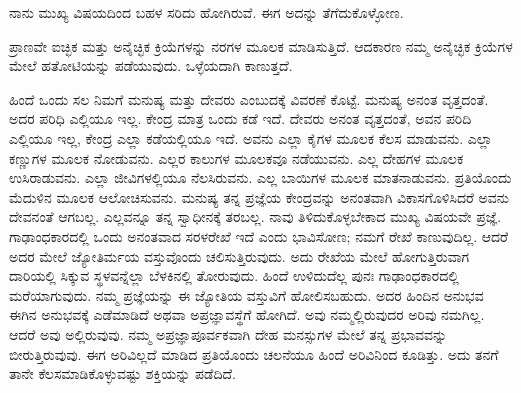 ನಾನು ಮುಖ್ಯ ವಿಷಯದಿಂದ ಬಹಳ ಸರಿದು ಹೋಗಿರುವೆ. ಈಗ ಅದನ್ನು ತೆಗೆದುಕೊಳ್ಳೋಣ.

ಪ್ರಾಣವೇ ಐಚ್ಛಿಕ ಮತ್ತು ಅನೈಚ್ಛಿಕ ಕ್ರಿಯೆಗಳನ್ನು ನರಗಳ ಮೂಲಕ ಮಾಡಿಸುತ್ತಿದೆ. ಆದಕಾರಣ ನಮ್ಮ ಅನೈಚ್ಛಿಕ ಕ್ರಿಯೆಗಳ ಮೇಲೆ ಹತೋಟಿಯನ್ನು ಪಡೆಯುವುದು. ಒಳ್ಳೆಯದಾಗಿ ಕಾಣುತ್ತದೆ.

ಹಿಂದೆ ಒಂದು ಸಲ ನಿಮಗೆ ಮನುಷ್ಯ ಮತ್ತು ದೇವರು ಎಂಬುದಕ್ಕೆ ವಿವರಣೆ ಕೊಟ್ಟೆ. ಮನುಷ್ಯ ಅನಂತ ವೃತ್ತದಂತೆ. ಅದರ ಪರಿಧಿ ಎಲ್ಲಿಯೂ ಇಲ್ಲ. ಕೇಂದ್ರ ಮಾತ್ರ ಒಂದು ಕಡೆ ಇದೆ. ದೇವರು ಅನಂತ ವೃತ್ತದಂತೆ, ಅವನ ಪರಿದಿ ಎಲ್ಲಿಯೂ ಇಲ್ಲ, ಕೇಂದ್ರ ಎಲ್ಲಾ ಕಡೆಯಲ್ಲಿಯೂ ಇದೆ. ಅವನು ಎಲ್ಲಾ ಕೈಗಳ ಮೂಲಕ ಕೆಲಸ ಮಾಡುವನು. ಎಲ್ಲಾ ಕಣ್ಣುಗಳ ಮೂಲಕ ನೋಡುವನು. ಎಲ್ಲರ ಕಾಲುಗಳ ಮೂಲಕವೂ ನಡೆಯುವನು. ಎಲ್ಲ ದೇಹಗಳ ಮೂಲಕ ಉಸಿರಾಡುವನು. ಎಲ್ಲಾ ಜೀವಿಗಳಲ್ಲಿಯೂ ನೆಲಸಿರುವನು. ಎಲ್ಲ ಬಾಯಿಗಳ ಮೂಲಕ ಮಾತನಾಡುವನು. ಪ್ರತಿಯೊಂದು ಮೆದುಳಿನ ಮೂಲಕ ಆಲೋಚಿಸುವನು. ಮನುಷ್ಯ ತನ್ನ ಪ್ರಜ್ಞೆಯ ಕೇಂದ್ರವನ್ನು ಅನಂತವಾಗಿ ವಿಕಾಸಗೊಳಿಸಿದರೆ ಅವನು ದೇವನಂತೆ ಆಗಬಲ್ಲ. ಎಲ್ಲವನ್ನೂ ತನ್ನ ಸ್ವಾಧೀನಕ್ಕೆ ತರಬಲ್ಲ. ನಾವು ತಿಳಿದುಕೊಳ್ಳಬೇಕಾದ ಮುಖ್ಯ ವಿಷಯವೇ ಪ್ರಜ್ಞೆ. ಗಾಢಾಂಧಕಾರದಲ್ಲಿ ಒಂದು ಅನಂತವಾದ ಸರಳರೇಖೆ ಇದೆ ಎಂದು ಭಾವಿಸೋಣ; ನಮಗೆ ರೇಖೆ ಕಾಣುವುದಿಲ್ಲ. ಆದರೆ ಅದರ ಮೇಲೆ ಜ್ಯೋತಿರ್ಮಯ ವಸ್ತುವೊಂದು ಚಲಿಸುತ್ತಿರುವುದು. ಅದು ರೇಖೆಯ ಮೇಲೆ ಹೋಗುತ್ತಿರುವಾಗ ದಾರಿಯಲ್ಲಿ ಸಿಕ್ಕುವ ಸ್ಥಳವನ್ನೆಲ್ಲಾ ಬೆಳಕಿನಲ್ಲಿ ತೋರುವುದು. ಹಿಂದೆ ಉಳಿದುದೆಲ್ಲ ಪುನಃ ಗಾಢಾಂಧಕಾರದಲ್ಲಿ ಮರೆಯಾಗುವುದು. ನಮ್ಮ ಪ್ರಜ್ಞೆಯನ್ನು ಈ ಜ್ಯೋತಿಯ ವಸ್ತುವಿಗೆ ಹೋಲಿಸಬಹುದು. ಅದರ ಹಿಂದಿನ ಅನುಭವ ಈಗಿನ ಅನುಭವಕ್ಕೆ ಎಡೆಮಾಡಿದೆ ಅಥವಾ ಅಪ್ರಜ್ಞಾವಸ್ಥೆಗೆ ಹೋಗಿದೆ. ಅವು ನಮ್ಮಲ್ಲಿರುವುದರ ಅರಿವು ನಮಗಿಲ್ಲ. ಆದರೆ ಅವು ಅಲ್ಲಿರುವುವು. ನಮ್ಮ ಅಪ್ರಜ್ಞಾಪೂರ್ವಕವಾಗಿ ದೇಹ ಮನಸ್ಸುಗಳ ಮೇಲೆ ತನ್ನ ಪ್ರಭಾವವನ್ನು ಬೀರುತ್ತಿರುವುವು. ಈಗ ಅರಿವಿಲ್ಲದೆ ಮಾಡಿದ ಪ್ರತಿಯೊಂದು ಚಲನೆಯೂ ಹಿಂದೆ ಅರಿವಿನಿಂದ ಕೂಡಿತ್ತು. ಅದು ತನಗೆ ತಾನೇ ಕೆಲಸಮಾಡಿಕೊಳ್ಳುವಷ್ಟು ಶಕ್ತಿಯನ್ನು ಪಡೆದಿದೆ.

\newpage

